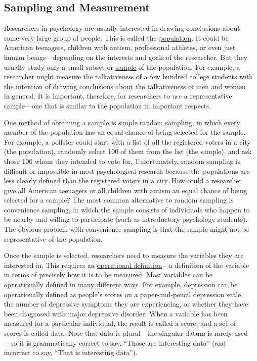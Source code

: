 \documentclass[
]{krantz}
\begin{document}
\hypertarget{sampling-and-measurement}{%
\subsection*{Sampling and Measurement}\label{sampling-and-measurement}}


Researchers in psychology are usually interested in drawing conclusions about some very large group of people. This is called the \protect\hyperlink{population-1}{population}. It could be American teenagers, children with autism, professional athletes, or even just human beings---depending on the interests and goals of the researcher. But they usually study only a small subset or \protect\hyperlink{sample-1}{sample} of the population. For example, a researcher might measure the talkativeness of a few hundred college students with the intention of drawing conclusions about the talkativeness of men and women in general. It is important, therefore, for researchers to use a representative sample---one that is similar to the population in important respects.

One method of obtaining a sample is simple random sampling, in which every member of the population has an equal chance of being selected for the sample. For example, a pollster could start with a list of all the registered voters in a city (the population), randomly select 100 of them from the list (the sample), and ask those 100 whom they intended to vote for. Unfortunately, random sampling is difficult or impossible in most psychological research because the populations are less clearly defined than the registered voters in a city. How could a researcher give all American teenagers or all children with autism an equal chance of being selected for a sample? The most common alternative to random sampling is convenience sampling, in which the sample consists of individuals who happen to be nearby and willing to participate (such as introductory psychology students). The obvious problem with convenience sampling is that the sample might not be representative of the population.

Once the sample is selected, researchers need to measure the variables they are interested in. This requires an \protect\hyperlink{operational-definition-1}{operational definition}---a definition of the variable in terms of precisely how it is to be measured. Most variables can be operationally defined in many different ways. For example, depression can be operationally defined as people's scores on a paper-and-pencil depression scale, the number of depressive symptoms they are experiencing, or whether they have been diagnosed with major depressive disorder. When a variable has been measured for a particular individual, the result is called a score, and a set of scores is called data. Note that data is plural---the singular datum is rarely used---so it is grammatically correct to say, ``Those are interesting data'' (and incorrect to say, ``That is interesting data'').
\end{document}

